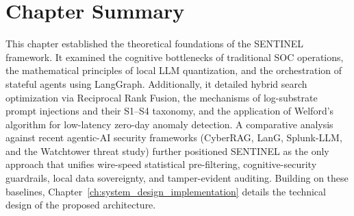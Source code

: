\section{Chapter Summary}

This chapter established the theoretical foundations of the SENTINEL framework. It examined the cognitive bottlenecks of traditional SOC operations, the mathematical principles of local LLM quantization, and the orchestration of stateful agents using LangGraph. Additionally, it detailed hybrid search optimization via Reciprocal Rank Fusion, the mechanisms of log-substrate prompt injections and their S1--S4 taxonomy, and the application of Welford's algorithm for low-latency zero-day anomaly detection. A comparative analysis against recent agentic-AI security frameworks (CyberRAG, LanG, Splunk-LLM, and the Watchtower threat study) further positioned SENTINEL as the only approach that unifies wire-speed statistical pre-filtering, cognitive-security guardrails, local data sovereignty, and tamper-evident auditing. Building on these baselines, Chapter~\ref{ch:system_design_implementation} details the technical design of the proposed architecture.
